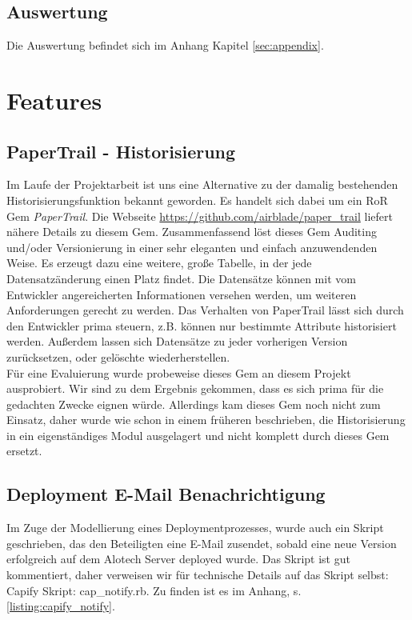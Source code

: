 \documentclass[12pt,             %
               a4paper,          %
               listof=totoc,     %
               index=totoc,      %
               bibliography=totoc,%
               oneside,         %
               BCOR1cm,          %
               english   %
               ]{scrbook}
\begin{document}
\section{Auswertung}
Die Auswertung befindet sich im Anhang Kapitel \vref{sec:appendix}.

\chapter{Features}
\section{PaperTrail - Historisierung}
Im Laufe der Projektarbeit ist uns eine Alternative zu der damalig bestehenden Historisierungsfunktion bekannt geworden. Es handelt sich dabei um ein RoR Gem \textit{PaperTrail}. Die Webseite \url{https://github.com/airblade/paper_trail} liefert nähere Details zu diesem Gem. Zusammenfassend löst dieses Gem  Auditing und/oder Versionierung in einer sehr eleganten und einfach anzuwendenden Weise. Es erzeugt dazu eine weitere, große Tabelle, in der jede Datensatzänderung einen Platz findet. Die Datensätze können mit vom Entwickler angereicherten Informationen versehen werden, um weiteren Anforderungen gerecht zu werden. Das Verhalten von PaperTrail lässt sich durch den Entwickler prima steuern, z.B. können nur bestimmte Attribute historisiert werden. Außerdem lassen sich Datensätze zu jeder vorherigen Version zurücksetzen, oder gelöschte wiederherstellen.\\
Für eine Evaluierung wurde probeweise dieses Gem an diesem Projekt ausprobiert. Wir sind zu dem Ergebnis gekommen, dass es sich prima für die gedachten Zwecke eignen würde. Allerdings kam dieses Gem noch nicht zum Einsatz, daher wurde wie schon in einem früheren beschrieben, die Historisierung in ein eigenständiges Modul ausgelagert und nicht komplett durch dieses Gem ersetzt.


\section{Deployment E-Mail Benachrichtigung}
Im Zuge der Modellierung eines Deploymentprozesses, wurde auch ein Skript geschrieben, das den Beteiligten eine E-Mail zusendet, sobald eine neue Version erfolgreich auf dem Alotech Server deployed wurde. Das Skript ist gut kommentiert, daher verweisen wir für technische Details auf das Skript selbst: Capify Skript: \glqq cap\_notify.rb\grqq. Zu finden ist es im Anhang, s. \vref{listing:capify_notify}.
\end{document}
